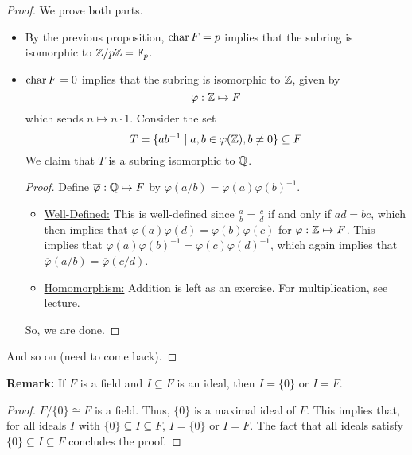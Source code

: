 \documentclass[letterpaper]{article}
\begin{document}
\begin{mdframed}[]
    \begin{proof}
        We prove both parts.
        \begin{itemize}
            \item By the previous proposition, $\operatorname{char} F = p$ implies that the subring is isomorphic to $\mathbb{Z} / p\mathbb{Z} = \mathbb{F}_p$.
            \item $\operatorname{char} F = 0$ implies that the subring is isomorphic to $\mathbb{Z}$, given by 
            \[\varphi: \mathbb{Z} \mapsto F\]
            which sends $n \mapsto n \cdot 1$. Consider the set 
            \[T = \{ab^{-1} \mid a, b \in \varphi(\mathbb{Z}), b \neq 0\} \subseteq F\]
            We claim that $T$ is a subring isomorphic to $\mathbb{Q}$. 
            \begin{proof}
                Define $\overline{\varphi}: \mathbb{Q} \mapsto F$ by $\overline{\varphi}(a / b) = \varphi(a) \varphi(b)^{-1}$. 

                \begin{itemize}
                    \item \underline{Well-Defined:} This is well-defined since $\frac{a}{b} = \frac{c}{d}$ if and only if $ad = bc$, which then implies that $\varphi(a) \varphi(d) = \varphi(b) \varphi(c)$ for $\varphi: \mathbb{Z} \mapsto F$. This implies that $\varphi(a) \varphi(b)^{-1} = \varphi(c) \varphi(d)^{-1}$, which again implies that $\overline{\varphi}(a / b) = \overline{\varphi}(c / d)$.
                    \item \underline{Homomorphism:} Addition is left as an exercise. For multiplication, see lecture. 
                \end{itemize}
                So, we are done. 
            \end{proof}
        \end{itemize}
        And so on (need to come back).
    \end{proof}
\end{mdframed}

\textbf{Remark:} If $F$ is a field and $I \subseteq F$ is an ideal, then $I = \{0\}$ or $I = F$.

\begin{mdframed}[]
    \begin{proof}
        $F / \{0\} \cong F$ is a field. Thus, $\{0\}$ is a maximal ideal of $F$. This implies that, for all ideals $I$ with $\{0\} \subseteq I \subseteq F$, $I = \{0\}$ or $I = F$. The fact that all ideals satisfy $\{0\} \subseteq I \subseteq F$ concludes the proof.
    \end{proof}
\end{mdframed}
\end{document}
